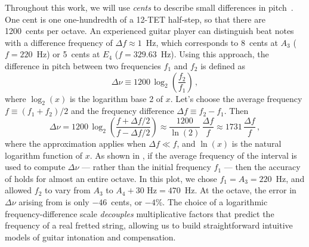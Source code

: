 Throughout this work, we will use \emph{cents} to describe small differences in pitch~\cite{ref:hall1985see,ref:hall1988anl,ref:krantz2000cie,ref:jedrzejewski2008gds,ref:varieschi2010icf,ref:durfee2015pms}. One cent is one one-hundredth of a 12-TET half-step, so that there are 1200~cents per octave. An experienced guitar player can distinguish beat notes with a difference frequency of $\Delta f \approx 1$~Hz, which corresponds to 8~cents at $A_3$ ($f = 220$~Hz) or 5~cents at $E_4$ ($f = 329.63$~Hz). Using this approach, the difference in pitch between two frequencies $f_1$ and $f_2$ is defined as
 \begin{equation} \label{eqn:cents_def}
\Delta \nu \equiv 1200\, \log_2\left(\frac{f_2}{f_1}\right)\, ,
 \end{equation}
where $\log_2(x)$ is the logarithm base 2 of $x$. Let's choose the average frequency $f \equiv (f_1 + f_2) / 2$ and the frequency difference $\Delta f \equiv f_2 - f_1$. Then
 \begin{equation} \label{eqn:cents_approx}
\Delta \nu = 1200\, \log_2\left(\frac{f + \Delta f / 2}{f - \Delta f /2}\right) \approx \frac{1200}{\ln(2)}\, \frac{\Delta f}{f} \approx 1731\, \frac{\Delta f}{f}\, ,
 \end{equation}
where the approximation applies when $\Delta f \ll f$, and $\ln(x)$ is the natural logarithm function of $x$. As shown in , if the average frequency of the interval is used to compute $\Delta \nu$ --- rather than the initial frequency $f_1$ --- then the accuracy of  holds for almost an entire octave. In this plot, we chose $f_1 = A_3 = 220$~Hz, and allowed $f_2$ to vary from $A_3$ to $A_4 + 30 \textrm{ Hz} = 470$~Hz. At the octave, the error in $\Delta \nu$ arising from  is only $-46$~cents, or $-4$\%. The choice of a logarithmic frequency-difference scale \emph{decouples} multiplicative factors that predict the frequency of a real fretted string, allowing us to build straightforward intuitive models of guitar intonation and compensation.
  

